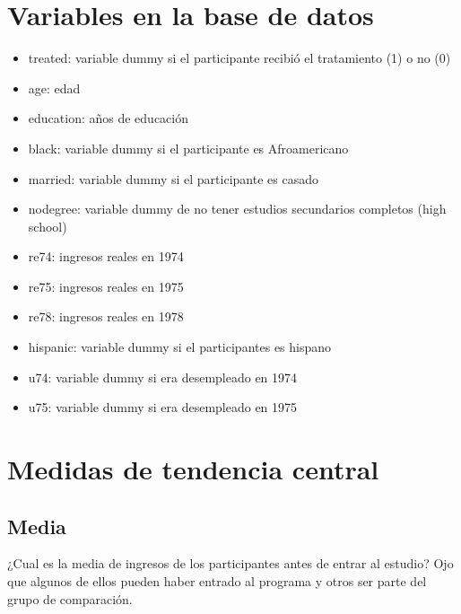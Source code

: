 \documentclass[
]{article}
\newenvironment{Shaded}{\begin{snugshade}}{\end{snugshade}}
\newcommand{\FunctionTok}[1]{\textcolor[rgb]{0.00,0.00,0.00}{#1}}
\newcommand{\NormalTok}[1]{#1}
\newcommand{\SpecialCharTok}[1]{\textcolor[rgb]{0.00,0.00,0.00}{#1}}
\providecommand{\tightlist}{%
  \setlength{\itemsep}{0pt}\setlength{\parskip}{0pt}}
\begin{document}
\hypertarget{variables-en-la-base-de-datos}{%
\section{Variables en la base de
datos}\label{variables-en-la-base-de-datos}}

\begin{itemize}
\tightlist
\item
  treated: variable dummy si el participante recibió el tratamiento (1)
  o no (0)
\item
  age: edad
\item
  education: años de educación
\item
  black: variable dummy si el participante es Afroamericano
\item
  married: variable dummy si el participante es casado
\item
  nodegree: variable dummy de no tener estudios secundarios completos
  (high school)
\item
  re74: ingresos reales en 1974
\item
  re75: ingresos reales en 1975
\item
  re78: ingresos reales en 1978
\item
  hispanic: variable dummy si el participantes es hispano
\item
  u74: variable dummy si era desempleado en 1974
\item
  u75: variable dummy si era desempleado en 1975
\end{itemize}

\hypertarget{medidas-de-tendencia-central-1}{%
\section{Medidas de tendencia
central}\label{medidas-de-tendencia-central-1}}

\hypertarget{media-1}{%
\subsection{Media}\label{media-1}}

¿Cual es la media de ingresos de los participantes antes de entrar al
estudio? Ojo que algunos de ellos pueden haber entrado al programa y
otros ser parte del grupo de comparación.

\begin{Shaded}
\end{Shaded}
\end{document}
